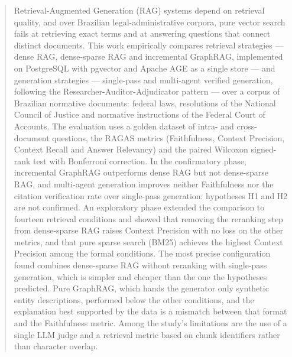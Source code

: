 
\begin{abstract}
Retrieval-Augmented Generation (RAG) systems depend on retrieval quality, and
over Brazilian legal-administrative corpora, pure vector search fails at
retrieving exact terms and at answering questions that connect distinct
documents. This work empirically compares retrieval strategies --- dense RAG,
dense-sparse RAG and incremental GraphRAG, implemented on PostgreSQL with
pgvector and Apache AGE as a single store --- and generation strategies ---
single-pass and multi-agent verified generation, following the
Researcher-Auditor-Adjudicator pattern --- over a corpus of Brazilian
normative documents: federal laws, resolutions of the National Council of
Justice and normative instructions of the Federal Court of Accounts. The
evaluation uses a golden dataset of intra- and cross-document questions, the
RAGAS metrics (Faithfulness, Context Precision, Context Recall and Answer
Relevancy) and the paired Wilcoxon signed-rank test with Bonferroni
correction. In the confirmatory phase, incremental GraphRAG outperforms dense
RAG but not dense-sparse RAG, and multi-agent generation improves neither
Faithfulness nor the citation verification rate over single-pass generation:
hypotheses H1 and H2 are not confirmed. An exploratory phase extended the
comparison to fourteen retrieval conditions and showed that removing the
reranking step from dense-sparse RAG raises Context Precision with no loss on
the other metrics, and that pure sparse search (BM25) achieves the highest
Context Precision among the formal conditions. The most precise configuration
found combines dense-sparse RAG without reranking with single-pass
generation, which is simpler and cheaper than the one the hypotheses
predicted. Pure GraphRAG, which hands the generator only synthetic entity
descriptions, performed below the other conditions, and the explanation best
supported by the data is a mismatch between that format and the Faithfulness
metric. Among the study's limitations are the use of a single LLM judge and a
retrieval metric based on chunk identifiers rather than character overlap.
\end{abstract}
